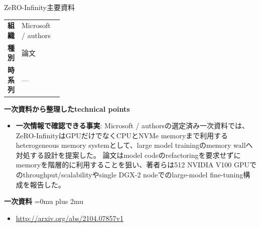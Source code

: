 \begin{technicalnote}{ZeRO-Infinity}{主要資料}
\begingroup
\begin{tabularx}{\linewidth}{@{}>{\bfseries}p{0.22\linewidth}X@{}}
組織 & Microsoft / authors \\
種別 & 論文 \\
時系列 & — \\
\end{tabularx}
\smallskip
{\bfseries 一次資料から整理したtechnical points}
\begin{itemize}[leftmargin=1.5em,itemsep=0.35em]
\item \textbf{一次情報で確認できる事実}: Microsoft / authorsの選定済み一次資料では、ZeRO-InfinityはGPUだけでなくCPUとNVMe memoryまで利用するheterogeneous memory systemとして、large model trainingのmemory wallへ対処する設計を提案した。 論文はmodel codeのrefactoringを要求せずにmemoryを階層的に利用することを狙い、著者らは512 NVIDIA V100 GPUでのthroughput/scalabilityやsingle DGX-2 nodeでのlarge-model fine-tuning構成を報告した。
\end{itemize}
\begin{minipage}{\linewidth}
\begin{samepage}
{\bfseries 一次資料}
\begingroup\sloppy
\Urlmuskip=0mu plus 2mu\relax
\begin{itemize}[leftmargin=1.5em,itemsep=0.25em]
\item {\scriptsize\url{http://arxiv.org/abs/2104.07857v1}}
\end{itemize}
\endgroup
\end{samepage}
\end{minipage}
\endgroup
\end{technicalnote}
\medskip

